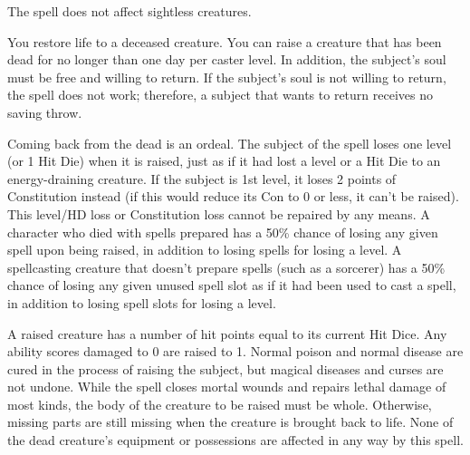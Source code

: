 \begin{multicols}{2}
\begin{small}
\smallskip\noindent The spell does not affect sightless creatures.


\noindent You restore life to a deceased creature. You can raise a creature that has been dead for no longer than one day per caster level. In addition, the subject's soul must be free and willing to return. If the subject's soul is not willing to return, the spell does not work; therefore, a subject that wants to return receives no saving throw.

\smallskip\noindent Coming back from the dead is an ordeal. The subject of the spell loses one level (or 1 Hit Die) when it is raised, just as if it had lost a level or a Hit Die to an energy-draining creature. If the subject is 1st level, it loses 2 points of Constitution instead (if this would reduce its Con to 0 or less, it can't be raised). This level/HD loss or Constitution loss cannot be repaired by any means. A character who died with spells prepared has a 50\% chance of losing any given spell upon being raised, in addition to losing spells for losing a level. A spellcasting creature that doesn't prepare spells (such as a sorcerer) has a 50\% chance of losing any given unused spell slot as if it had been used to cast a spell, in addition to losing spell slots for losing a level.

\smallskip\noindent A raised creature has a number of hit points equal to its current Hit Dice. Any ability scores damaged to 0 are raised to 1. Normal poison and normal disease are cured in the process of raising the subject, but magical diseases and curses are not undone. While the spell closes mortal wounds and repairs lethal damage of most kinds, the body of the creature to be raised must be whole. Otherwise, missing parts are still missing when the creature is brought back to life. None of the dead creature's equipment or possessions are affected in any way by this spell.


\end{small}
\end{multicols}
